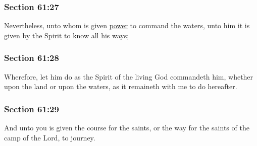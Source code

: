 	\subsubsection{Section 61:27} %
		\label{DC61-27}

		Nevertheless, unto whom is given \hyperref[POWER]{power} to command the waters, unto him it is given by the Spirit to know all his ways;


	\subsubsection{Section 61:28} %
		\label{DC61-28}

		Wherefore, let him do as the Spirit of the living God commandeth him, whether upon the land or upon the waters, as it remaineth with me to do hereafter.


	\subsubsection{Section 61:29} %
		\label{DC61-29}

		And unto you is given the course for the saints, or the way for the saints of the camp of the Lord, to journey.


